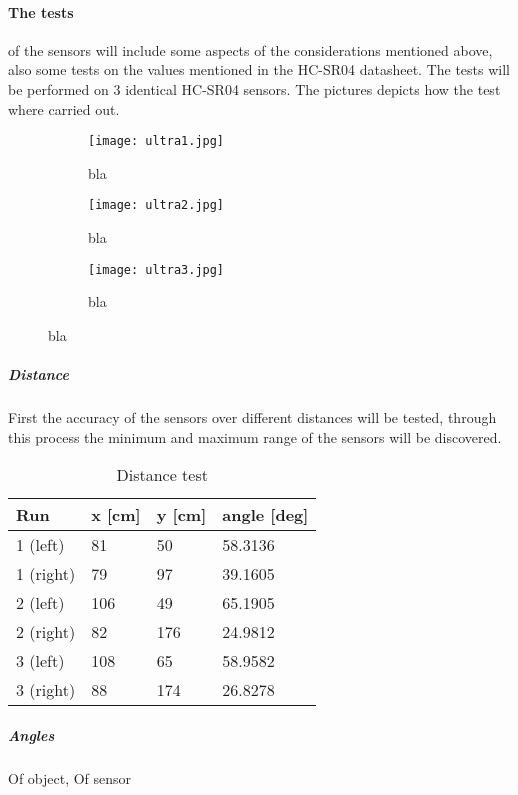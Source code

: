 \paragraph{The tests} of the sensors will include some aspects of the considerations mentioned above, also some tests on the values mentioned in the HC-SR04 datasheet\cite{hcsr04}. The tests will be performed on 3 identical HC-SR04 sensors. The pictures  depicts how the test where carried out.

\begin{figure}[htbp]
  \begin{subfigure}{.3\textwidth}
    \centering
    \texttt{[image: ultra1.jpg]}
    \caption{bla}
    \label{fig:ultra1}
  \end{subfigure}
  \begin{subfigure}{.3\textwidth}
    \centering
    \texttt{[image: ultra2.jpg]}
    \caption{bla}
    \label{fig:ultra2}
  \end{subfigure}
  \begin{subfigure}{.3\textwidth}
    \centering
    \texttt{[image: ultra3.jpg]}
    \caption{bla}
    \label{fig:ultra3}
  \end{subfigure}
\end{figure}
  
  \subparagraph{Distance}
  First the accuracy of the sensors over different distances will be tested, through this process the minimum and maximum range of the sensors will be discovered. 
  \begin{table}[htbp]
    \centering
    \begin{tabular}{@{}llll@{}}
      \toprule
      Run & x [cm] & y [cm] & angle [deg] \\ \midrule
      1 (left) & 81 & 50 & 58.3136 \\
      1 (right) & 79 & 97 & 39.1605  \\ \midrule
      2 (left) & 106 & 49 & 65.1905 \\
      2 (right) & 82 & 176 & 24.9812 \\ \midrule
      3 (left) & 108 & 65 & 58.9582 \\
      3 (right) & 88 & 174 & 26.8278 \\ \bottomrule
    \end{tabular}
    \caption{Distance test}
    \label{tab:ult_distance}
  \end{table}
%  
  \subparagraph{Angles}
  Of object, Of sensor
  
